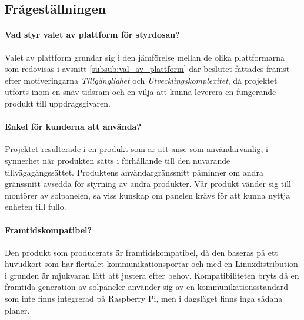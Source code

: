 \documentclass{article}
\begin{document}
        \subsection{Frågeställningen} %
        \label{sub:fragestallningen}
            \paragraph{\textrm{Vad styr valet av plattform för styrdosan?}} %
            \label{par:vad_styr_valet}
                Valet av plattform grundar sig i den jämförelse mellan de olika plattformarna som redovisas i avsnitt \ref{subsub:val_av_plattform} där beslutet fattades främst efter motiveringarna \emph{Tillgänglighet} och \emph{Utvecklingskomplexitet}, då projektet utförts inom en snäv tidsram och en vilja att kunna leverera en fungerande produkt till uppdragsgivaren. 

            \paragraph{\textrm{Enkel för kunderna att använda?}} %
            \label{par:enk}
                Projektet resulterade i en produkt som är att anse som användarvänlig, i synnerhet när produkten sätts i förhållande till den nuvarande tillväga\-gångs\-sättet. Produktens användar\-gräns\-snitt påminner om andra gränssnitt avsedda för styrning av andra produkter. Vår produkt vänder sig till montörer av solpanelen, så viss kunskap om panelen krävs för att kunna nyttja enheten till fullo.

            \paragraph{\textrm{Framtidskompatibel?}} %
            \label{par:framtidskomaptibel}
                Den produkt som producerats är framtidskompatibel, då den baseras på ett huvudkort som har flertalet kommunikationsportar och med en Linux\-distribution i grunden är mjukvaran lätt att justera efter behov. Kompatibiliteten bryts då en framtida generation av solpaneler använder sig av en kommunikationsstandard som inte finns integrerad på Raspberry Pi, men i dagsläget finns inga sådana planer.
\end{document}

